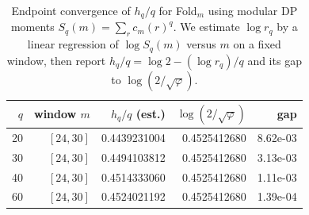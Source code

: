 \begin{table}[H]
\centering
\scriptsize
\setlength{\tabcolsep}{6pt}
\caption{Endpoint convergence of $h_q/q$ for Fold$_m$ using modular DP moments $S_q(m)=\sum_r c_m(r)^q$. We estimate $\log r_q$ by a linear regression of $\log S_q(m)$ versus $m$ on a fixed window, then report $h_q/q=\log 2-(\log r_q)/q$ and its gap to $\log(2/\sqrt{\varphi})$.}
\label{tab:fold_collision_renyi_endpoint_convergence_q60}
\begin{tabular}{r r r r r}
\toprule
$q$ & window $m$ & $h_q/q$ (est.) & $\log(2/\sqrt{\varphi})$ & gap\\
\midrule
20 & $[24,30]$ & 0.4439231004 & 0.4525412680 & 8.62e-03\\
30 & $[24,30]$ & 0.4494103812 & 0.4525412680 & 3.13e-03\\
40 & $[24,30]$ & 0.4514333060 & 0.4525412680 & 1.11e-03\\
60 & $[24,30]$ & 0.4524021192 & 0.4525412680 & 1.39e-04\\
\bottomrule
\end{tabular}
\end{table}
